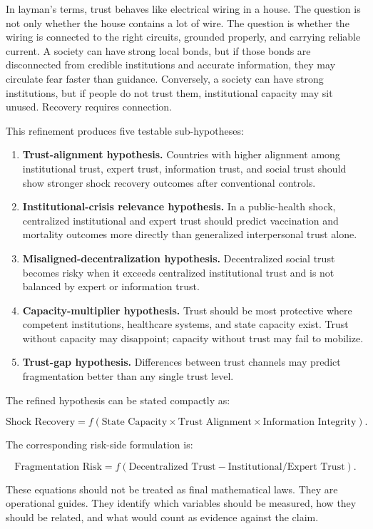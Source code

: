 \documentclass[12pt]{article}
\begin{document}
In layman's terms, trust behaves like electrical wiring in a house. The question is not only whether the house contains a lot of wire. The question is whether the wiring is connected to the right circuits, grounded properly, and carrying reliable current. A society can have strong local bonds, but if those bonds are disconnected from credible institutions and accurate information, they may circulate fear faster than guidance. Conversely, a society can have strong institutions, but if people do not trust them, institutional capacity may sit unused. Recovery requires connection.

This refinement produces five testable sub-hypotheses:

\begin{enumerate}
  \item \textbf{Trust-alignment hypothesis.} Countries with higher alignment among institutional trust, expert trust, information trust, and social trust should show stronger shock recovery outcomes after conventional controls.
  \item \textbf{Institutional-crisis relevance hypothesis.} In a public-health shock, centralized institutional and expert trust should predict vaccination and mortality outcomes more directly than generalized interpersonal trust alone.
  \item \textbf{Misaligned-decentralization hypothesis.} Decentralized social trust becomes risky when it exceeds centralized institutional trust and is not balanced by expert or information trust.
  \item \textbf{Capacity-multiplier hypothesis.} Trust should be most protective where competent institutions, healthcare systems, and state capacity exist. Trust without capacity may disappoint; capacity without trust may fail to mobilize.
  \item \textbf{Trust-gap hypothesis.} Differences between trust channels may predict fragmentation better than any single trust level.
\end{enumerate}

The refined hypothesis can be stated compactly as:

\[
\text{Shock Recovery} =
f(\text{State Capacity} \times \text{Trust Alignment} \times \text{Information Integrity}).
\]

The corresponding risk-side formulation is:

\[
\text{Fragmentation Risk} =
f(\text{Decentralized Trust} - \text{Institutional/Expert Trust}).
\]

These equations should not be treated as final mathematical laws. They are operational guides. They identify which variables should be measured, how they should be related, and what would count as evidence against the claim.
\end{document}
